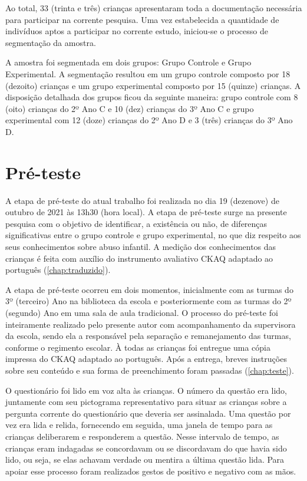 Ao total, 33 (trinta e três) crianças apresentaram toda a documentação necessária para participar na corrente pesquisa. Uma vez estabelecida a quantidade de indivíduos aptos a participar no corrente estudo, iniciou-se o processo de segmentação da amostra. 

A amostra foi segmentada em dois grupos: Grupo Controle e Grupo Experimental. A segmentação resultou em um grupo controle composto por 18 (dezoito) crianças e um grupo experimental composto por 15 (quinze) crianças. A disposição detalhada dos grupos ficou da seguinte maneira: grupo controle com 8 (oito) crianças do 2º Ano C e 10 (dez) crianças do 3º Ano C e grupo experimental com 12 (doze) crianças do 2º Ano D e 3 (três) crianças do 3º Ano D.


\section{Pré-teste}\label{sec:pretes}

A etapa de pré-teste do atual trabalho foi realizada no dia 19 (dezenove) de outubro de 2021 às 13h30 (hora local). A etapa de pré-teste surge na presente pesquisa com o objetivo de identificar, a existência ou não, de diferenças significativas entre o grupo controle e grupo experimental, no que diz respeito aos seus conhecimentos sobre abuso infantil. A medição dos conhecimentos das crianças é feita com auxílio do instrumento avaliativo \acf{CKAQ} adaptado ao português (\autoref{chap:traduzido}). 

A etapa de pré-teste ocorreu em dois momentos, inicialmente com as turmas do 3º (terceiro) Ano na biblioteca da escola e posteriormente com as turmas do 2º (segundo) Ano em uma sala de aula tradicional. O processo do pré-teste foi inteiramente realizado pelo presente autor com acompanhamento da supervisora da escola, sendo ela a responsável pela separação e remanejamento das turmas, conforme o regimento escolar. À todas as crianças foi entregue uma cópia impressa do \ac{CKAQ} adaptado ao português. Após a entrega, breves instruções sobre seu conteúdo e sua forma de preenchimento foram passadas (\autoref{chap:teste}). %

O questionário foi lido em voz alta às crianças. O número da questão era lido, juntamente com seu pictograma representativo para situar as crianças sobre a pergunta corrente do questionário que deveria ser assinalada. Uma questão por vez era lida e relida, fornecendo em seguida, uma janela de tempo para as crianças deliberarem e responderem a questão. Nesse intervalo de tempo, as crianças eram indagadas se concordavam ou se discordavam do que havia sido lido, ou seja, se elas achavam verdade ou mentira a última questão lida. Para apoiar esse processo foram realizados gestos de positivo e negativo com as mãos.

